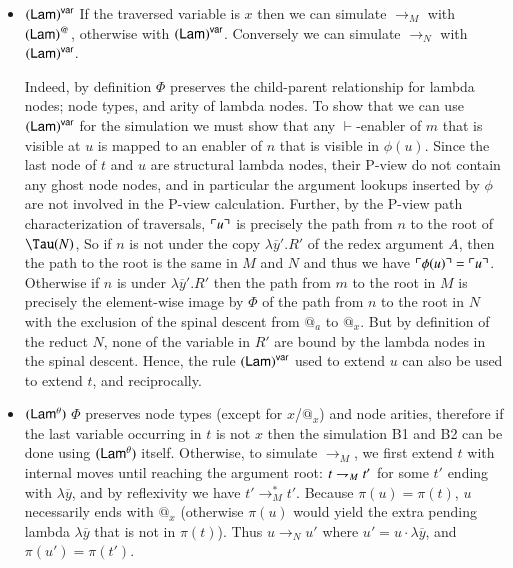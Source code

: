 \documentclass{elsarticle}
\theoremstyle{plain}
\theoremstyle{definition}
\newcommand{\ghostvar}{\theta}
\def\coresymbol{\pi} %
\newcommand{\core}[1]{\coresymbol(#1)} %
\newcommand{\enables}{\vdash} %
\newcommand{\ctree}{\Tau} %
\begin{document}
\begin{itemize}[itemindent=0.1em, leftmargin=0.4em]
    \item $\mathbf{({\sf Lam})}^{\sf var}$
    If the traversed variable is $x$ then
    we can simulate $\rightarrow_M$
     with  $\mathbf{({\sf Lam})}^@$, otherwise with
     $\mathbf{({\sf Lam})}^{\sf var}$.
     Conversely we can simulate $\rightarrow_N$ with
     $\mathbf{({\sf Lam})}^{\sf var}$.

    Indeed, by definition $\Phi$ preserves the child-parent relationship for lambda nodes; node types, and arity of lambda nodes.
    To show that we can use $\mathbf{({\sf Lam})}^{\sf var}$ for the simulation we must show that any $\enables$-enabler of $m$ that is visible at $u$ is mapped to an enabler of $n$ that is visible in $\phi(u)$.
    Since the last node of $t$ and $u$ are structural lambda nodes, their P-view do not contain any ghost node nodes, and in particular the argument lookups inserted by $\phi$ are not involved in the P-view calculation.
    Further, by the P-view path characterization of traversals, $\ulcorner u \urcorner$ is precisely the path from $n$ to the root of $\ctree(N)$,
    So if $n$ is not under the copy $\lambda\overline{y}'.R'$ of the redex argument $A$, then the path to the root is the same in $M$ and $N$ and thus we have $\ulcorner \phi(u) \urcorner = \ulcorner u \urcorner$.
    Otherwise if $n$ is under $\lambda\overline{y}'.R'$ then the path from $m$ to the root in $M$ is precisely the element-wise image by $\Phi$ of the path from $n$ to the root in $N$ with the exclusion of the spinal descent from $@_a$ to $@_x$. But by definition of the reduct $N$, none of the variable in $R'$ are bound by the lambda nodes in the spinal descent.
    Hence, the rule $\mathbf{({\sf Lam})}^{\sf var}$ used to extend  $u$ can also be used to extend $t$, and reciprocally.

    \item $\rulename{Lam^\ghostvar}$
    $\Phi$ preserves node types (except for $x$/$@_x$)
    and node arities, therefore if the last variable occurring in $t$ is not $x$ then the simulation B1 and B2 can be done using $\rulename{Lam^\ghostvar}$ itself.
    Otherwise, to simulate $\rightarrow_M$, we first extend $t$ with internal moves
    until reaching the argument root: $t \rightharpoondown_M t'$ for some $t'$ ending with $\lambda\overline{y}$, and by reflexivity we have $t' \rightarrow_M^* t'$.
    Because $\core{u} = \core{t}$, $u$ necessarily ends with $@_x$ (otherwise
    $\core{u}$ would yield the extra pending lambda  $\lambda\overline{y}$ that is not in $\core{t}$).
    Thus $u \rightarrow_N u'$ where $u' = u \cdot \lambda\overline{y}$,
    and $\core{u'} = \core{t'}$.


\end{itemize}
\end{document}
